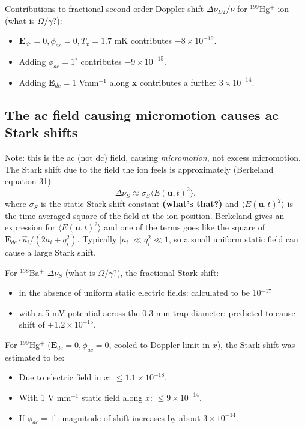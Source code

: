 \documentclass{article}
\begin{document}
Contributions to fractional second-order Doppler shift $\Delta \nu_{D2} / \nu$ for $^{199}$Hg$^+$ ion (what is $\Omega/\gamma$?): 

\begin{itemize}
\item $\mathbf{E}_{dc} = 0, \phi_{ac} = 0, T_x = 1.7$ mK contributes $-8 \times 10^{-19}$.
\item Adding $\phi_{ac} = 1^{\circ}$ contributes $-9 \times 10^{-15}$.
\item Adding $\mathbf{E}_{dc} = 1$ Vmm$^{-1}$ along \textbf{x} contributes a further $3 \times 10^{-14}$.
\end{itemize}


\subsection*{The ac field causing micromotion causes ac Stark shifts}

Note: this is the ac (not dc) field, causing \textit{micromotion}, not excess micromotion. The Stark shift due to the field the ion feels is approximately (Berkeland equation 31):
%
\begin{equation}
\Delta \nu_S \approx \sigma_S \langle E(\mathbf{u}, t)^2 \rangle, 
\end{equation}
%
where $\sigma_S$ is the static Stark shift constant \textbf{(what's that?)} and $\langle E(\mathbf{u}, t)^2 \rangle$ is the time-averaged square of the field at the ion position. Berkeland gives an expression for $\langle E(\mathbf{u}, t)^2 \rangle$ and one of the terms goes like the square of $\mathbf{E}_{dc} \cdot \hat{u}_i / (2a_i + q^2_i)$. Typically $|a_i| \ll q^2_i \ll 1$, so a small uniform static field can cause a large Stark shift.

For $^{138}$Ba$^+$ $\Delta \nu_S$ (what is $\Omega/\gamma$?), the fractional Stark shift:

\begin{itemize}
\item in the absence of uniform static electric fields: calculated to be 10$^{-17}$
\item with a 5 mV potential across the 0.3 mm trap diameter: predicted to cause shift of $+ 1.2 \times 10^{-15}$.
\end{itemize} 

For $^{199}$Hg$^+$ ($\mathbf{E}_{dc} = 0, \phi_{ac} = 0$, cooled to Doppler limit in $x$), the Stark shift was estimated to be:

\begin{itemize}
\item Due to electric field in $x$: $\leq 1.1 \times 10^{-18}$.
\item With 1 V mm$^{-1}$ static field along $x$: $\leq 9 \times 10^{-14}$.
\item If $\phi_{ac} = 1^{\circ}$: magnitude of shift increases by about $3 \times 10^{-14}$.
\end{itemize}
\end{document}
